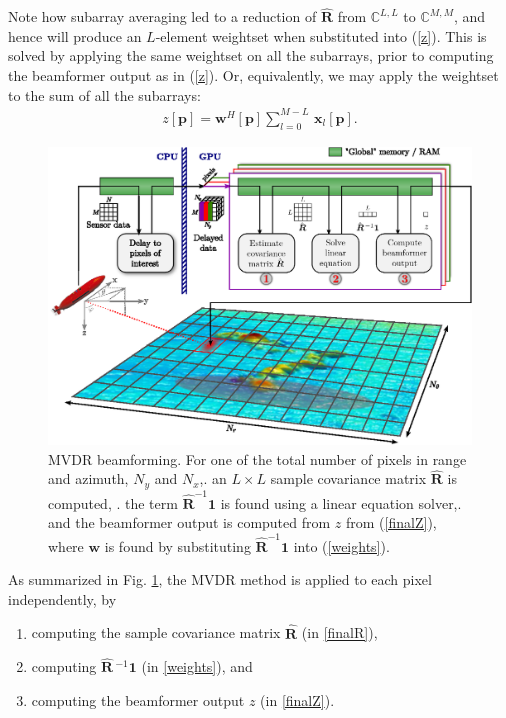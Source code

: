 \documentclass[12pt,journal,captionsoff,onecolumn]{IEEEtran}
\let\MYoriglatexcaption\caption               %
\renewcommand{\caption}[2][\relax]{\MYoriglatexcaption[#2]{#2}}
\newcommand\sumb[2]{\sum\limits_{#1}^{#2}\,}
\renewcommand\H{^{\scriptscriptstyle H}}
\renewcommand\vec[1]{\boldsymbol{#1}}
\newcommand\mat[1]{\boldsymbol{#1}}
\newcommand\1{\vec 1}
\newcommand*\p{\vec p}
\newcommand*\w{\vec w}
\newcommand*\x{\vec x}
\newcommand*\eR{\mat{\hat R}}
\newcommand*\eRi{\hat{\mat R}\,\!^{-1}}
\begin{document}
Note how subarray averaging led to a reduction of $\eR$ from $\mathbb{C}^{L,L}$ to $\mathbb{C}^{M,M}$, and hence will produce an $L$-element weightset when substituted into (\ref{z}). This is solved by applying the same weightset on all the subarrays, prior to computing the beamformer output as in (\ref{z}). Or, equivalently, we may apply the weightset to the sum of all the subarrays:
\begin{align}
z[\p] = \w\H[\p] \sumb{l=0}{M-L} \x_l[\p].\label{finalZ}
\end{align}
\begin{figure}[!t]\centering
\includegraphics[width=\linewidth]{gfx/implementation.eps}
\caption{MVDR beamforming. For one of the total number of pixels in range and azimuth, $N_y$ and $N_x$,\newline
1. an $L\times{}L$ sample covariance matrix $\eR$ is computed, \newline
2. the term $\eR^{-1}\1$ is found using a linear equation solver,\newline
3. and the beamformer output is computed from $z$ from (\ref{finalZ}), where $\w$ is found by substituting $\eR^{-1}\1$ into (\ref{weights}). } \label{mvdr_beamforming}
\end{figure}
As summarized in Fig. \ref{mvdr_beamforming}, the MVDR method is applied to each pixel independently, by
\begin{enumerate}
\item computing the sample covariance matrix $\eR$ (in \ref{finalR}),
\item computing $\eRi\1$ (in \ref{weights}), and
\item computing the beamformer output $z$ (in \ref{finalZ}).
\end{enumerate}
\end{document}
